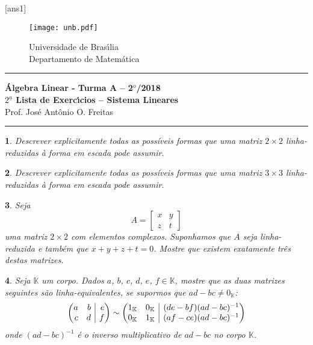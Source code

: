 \documentclass[12pt]{exam}
\makeatletter
\newenvironment{amatrix}[1]{%
  \left(\begin{array}{@{}*{#1}{r}|r@{}}
}{%
  \end{array}\right)
}
\newtheorem{exercicio}{}
\newcommand{\cp}[1]{\mathbb{#1}}
\newcommand{\vesp}[1]{\vspace{ #1  cm}}
\makeatother
\begin{document}
\pagestyle{empty}

[ans1]

\begin{figure}[h]
        \begin{minipage}[c]{1.7cm}
        \texttt{[image: unb.pdf]}
        \end{minipage}%
        \hspace{0pt}
        \begin{minipage}[c]{4in}
          {Universidade de Bras{\'\i}lia} \\
          {Departamento de Matem{\'a}tica}
\end{minipage}
\end{figure}

\vesp{-0.35} \hrule

\begin{center}
{\Large\bf \'Algebra Linear - Turma A -- 2$^{o}$/2018} \\ \vspace{9pt} {\large\bf
  $2^{\underline{a}}$ Lista de Exerc{\'\i}cios -- Sistema Lineares}\\ \vspace{9pt} Prof. Jos{\'e} Ant{\^o}nio O. Freitas
\end{center}
\hrule

\vesp{.6}
\begin{exercicio}
  Descrever explicitamente todas as possíveis formas que uma matriz $2 \times 2$ linha-reduzidas \`a forma em escada pode assumir.
\end{exercicio}

\begin{exercicio}
  Descrever explicitamente todas as possíveis formas que uma matriz $3 \times 3$ linha-reduzidas \`a forma em escada pode assumir.
\end{exercicio}

\begin{exercicio}
  Seja
  \[
    A = \begin{bmatrix}
      x & y\\
      z & t
    \end{bmatrix}
  \]
  uma matriz $2 \times 2$ com elementos complexos. Suponhamos que $A$ seja linha-reduzida e tamb\'em que $x + y + z + t = 0$. Mostre que existem exatamente tr\^es destas matrizes.
\end{exercicio}

\begin{exercicio}
  Seja $\cp{K}$ um corpo. Dados $a$, $b$, $c$, $d$, $e$, $f \in \cp{K}$, mostre que as duas matrizes seguintes s\~ao linha-equivalentes, se supormos que $ad - bc \ne 0_{\cp{K}}$:
  \[
    \begin{amatrix}{2}
      a & b & e\\
      c & d & f
    \end{amatrix} \sim \begin{amatrix}{2}
      1_{\cp{K}} & 0_{\cp{K}} & (de - bf)(ad - bc)^{-1}\\
      0_{\cp{K}} & 1_{\cp{K}} & (af - ce)(ad - bc)^{-1}
    \end{amatrix}
  \]
  onde $(ad - bc)^{-1}$ \'e o inverso multiplicativo de $ad - bc$ no corpo $\cp{K}$.
\end{exercicio}
\end{document}
